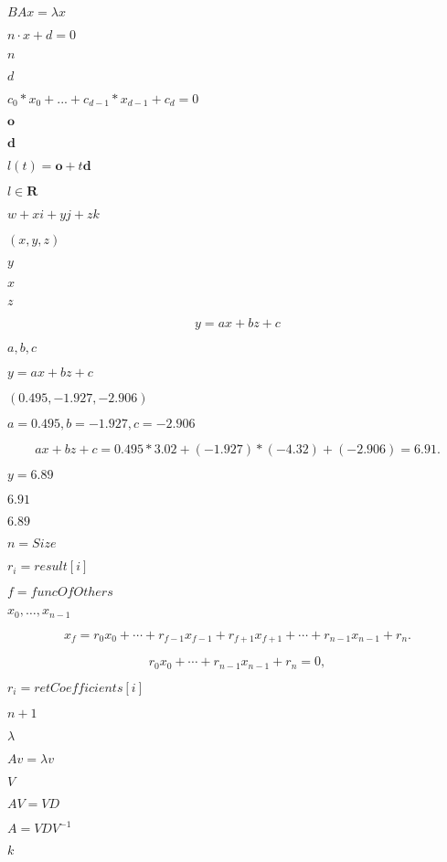 \documentclass{article}
\begin{document}
$ BAx = \lambda x $
\pagebreak

$ n \cdot x + d = 0 $
\pagebreak

$ n $
\pagebreak

$ d $
\pagebreak

$ c_0*x_0 + ... + c_{d-1}*x_{d-1} + c_d = 0 $
\pagebreak

$ \mathbf{o} $
\pagebreak

$ \mathbf{d} $
\pagebreak

$ l(t) = \mathbf{o} + t \mathbf{d} $
\pagebreak

$ l \in \mathbf{R} $
\pagebreak

$ w+xi+yj+zk $
\pagebreak

$(x,y,z)$
\pagebreak

$y$
\pagebreak

$x$
\pagebreak

$z$
\pagebreak

\[ y=ax+bz+c \]
\pagebreak

$a,b,c$
\pagebreak

$y=ax+bz+c$
\pagebreak

$( 0.495 , -1.927 , -2.906 )$
\pagebreak

$a=0.495, b = -1.927, c = -2.906$
\pagebreak

\[ax+bz+c = 0.495 * 3.02 + (-1.927) * (-4.32) + (-2.906) = 6.91.\]
\pagebreak

$y=6.89$
\pagebreak

$6.91$
\pagebreak

$6.89$
\pagebreak

$n=Size$
\pagebreak

$r_i=result[i]$
\pagebreak

$f=funcOfOthers$
\pagebreak

$x_0,\ldots,x_{n-1}$
\pagebreak

\[ x_f = r_0 x_0 + \cdots + r_{f-1}x_{f-1} + r_{f+1}x_{f+1} + \cdots + r_{n-1}x_{n-1} + r_n. \]
\pagebreak

\[ r_0 x_0 + \cdots + r_{n-1}x_{n-1} + r_n = 0, \]
\pagebreak

$r_i=retCoefficients[i]$
\pagebreak

$n+1$
\pagebreak

$ \lambda $
\pagebreak

$ Av = \lambda v $
\pagebreak

$ V $
\pagebreak

$ A V = V D $
\pagebreak

$ A = V D V^{-1} $
\pagebreak

$ k $
\pagebreak
\end{document}
